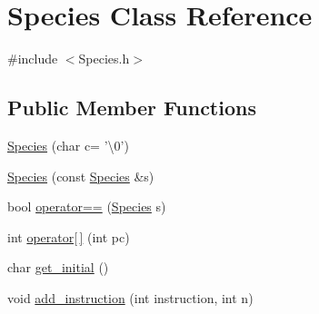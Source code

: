 \hypertarget{classSpecies}{\section{Species Class Reference}
\label{classSpecies}
}


{\ttfamily \#include $<$Species.\-h$>$}

\subsection*{Public Member Functions}
\begin{DoxyCompactItemize}
\item 
\hyperlink{classSpecies_ae1e8c8dee5a444fbc37cf92e729313a0}{Species} (char c= '\textbackslash{}0')
\item 
\hyperlink{classSpecies_a45a910b09cd417a5f219b51722c49227}{Species} (const \hyperlink{classSpecies}{Species} \&s)
\item 
bool \hyperlink{classSpecies_a1c655e6b935bb1da8cbfb5ed19e00883}{operator==} (\hyperlink{classSpecies}{Species} s)
\item 
int \hyperlink{classSpecies_a1c9d40340e45fb266518454d2b69cee9}{operator\mbox{[}$\,$\mbox{]}} (int pc)
\item 
char \hyperlink{classSpecies_a1c25de9af95f82d274d6c6f4ed89f625}{get\-\_\-initial} ()
\item 
void \hyperlink{classSpecies_a9ac466e32bb35828437425e69c440f12}{add\-\_\-instruction} (int instruction, int n)
\end{DoxyCompactItemize}
